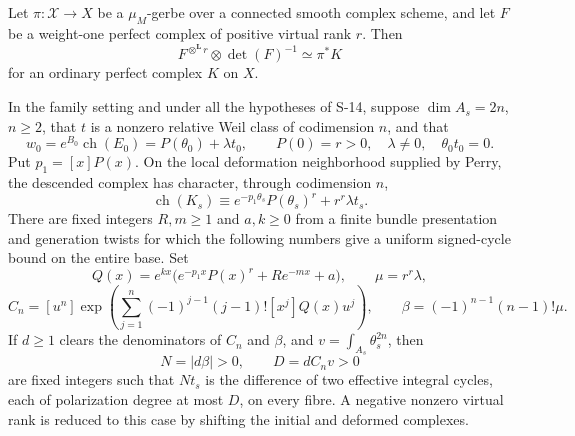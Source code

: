 \begin{proposition}
\label{prop:semireg-tensor-determinant}
Let $\pi:\mathcal X\to X$ be a $\mu_M$-gerbe over a connected
smooth complex scheme, and let $F$ be a weight-one perfect complex
of positive virtual rank $r$. Then
\[
 F^{\otimes^{\mathbf L}r}\otimes\det(F)^{-1}
 \simeq\pi^*K
\]
for an ordinary perfect complex $K$ on $X$.

In the family setting and under all the hypotheses of S-14,
suppose $\dim A_s=2n$, $n\ge2$, that $t$ is a nonzero relative
Weil class of codimension $n$, and that
\[
 w_0=e^{B_0}\operatorname{ch}(E_0)
     =P(\theta_0)+\lambda t_0,
 \qquad P(0)=r>0,\quad\lambda\ne0,\quad\theta_0t_0=0.
\]
Put $p_1=[x]P(x)$. On the local deformation neighborhood supplied
by Perry, the descended complex has character, through
codimension $n$,
\[
 \operatorname{ch}(K_s)
 \equiv e^{-p_1\theta_s}P(\theta_s)^r+r^r\lambda t_s.
 \tag{S17.1}
\]
There are fixed integers $R,m\ge1$ and $a,k\ge0$ from a finite
bundle presentation and generation twists for which the following
numbers give a uniform signed-cycle bound on the entire base.
Set
\[
 Q(x)=e^{kx}\bigl(e^{-p_1x}P(x)^r+R e^{-mx}+a\bigr),
 \qquad\mu=r^r\lambda,
\]
\[
 C_n=[u^n]\exp\!\left(\sum_{j=1}^n
     (-1)^{j-1}(j-1)![x^j]Q(x)u^j\right),
 \qquad\beta=(-1)^{n-1}(n-1)!\mu .
\]
If $d\ge1$ clears the denominators of $C_n$ and $\beta$, and
$v=\int_{A_s}\theta_s^{2n}$, then
\[
 N=|d\beta|>0,\qquad D=dC_nv>0
 \tag{S17.2}
\]
are fixed integers such that $Nt_s$ is the difference of two
effective integral cycles, each of polarization degree at most
$D$, on every fibre. A negative nonzero virtual rank is reduced
to this case by shifting the initial and deformed complexes.
\end{proposition}

